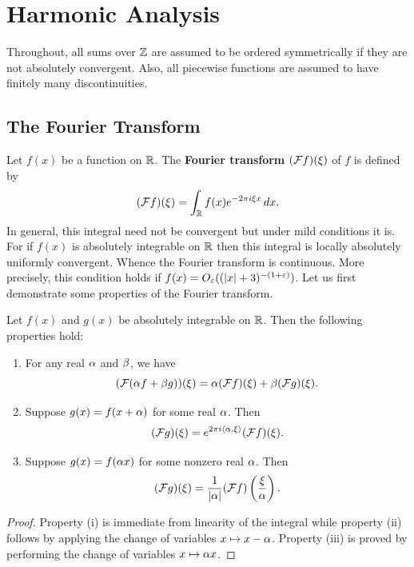 \chapter{Harmonic Analysis}
  Throughout, all sums over \(\mathbb{Z}\) are assumed to be ordered symmetrically if they are not absolutely convergent. Also, all piecewise functions are assumed to have finitely many discontinuities.
  \section{The Fourier Transform}\label{sec:the_Fourier_transform}
    Let \(f(x)\) be a function on \(\mathbb{R}\). The \textbf{Fourier transform} \((\mathcal{F}f)(\xi)\) of \(f\) is defined by
    \[
      (\mathcal{F}f)(\xi) = \int_{\mathbb{R}}f(x)e^{-2\pi i\xi x}\,dx.
    \]
    In general, this integral need not be convergent but under mild conditions it is. For if \(f(x)\) is absolutely integrable on \(\mathbb{R}\) then this integral is locally absolutely uniformly convergent. Whence the Fourier transform is continuous. More precisely, this condition holds if \(f(x) = O_{\varepsilon}((|x|+3)^{-(1+\varepsilon)})\). Let us first demonstrate some properties of the Fourier transform.

    \begin{proposition}
      Let \(f(x)\) and \(g(x)\) be absolutely integrable on \(\mathbb{R}\). Then the following properties hold:
      \begin{enumerate}[label*=(\roman*)]
        \item For any real \(\alpha\) and \(\beta\), we have
        \[
          (\mathcal{F}(\alpha f+\beta g))(\xi) = \alpha(\mathcal{F}f)(\xi)+\beta(\mathcal{F}g)(\xi).
        \]
        \item Suppose \(g(x) = f(x+\alpha)\) for some real \(\alpha\). Then
        \[
          (\mathcal{F}g)(\xi) = e^{2\pi i\langle\alpha,\xi\rangle}(\mathcal{F}f)(\xi).
        \]
        \item Suppose \(g(x) = f(\alpha x)\) for some nonzero real \(\alpha\). Then
        \[
          (\mathcal{F}g)(\xi) = \frac{1}{|\alpha|}(\mathcal{F}f)\left(\frac{\xi}{\alpha}\right).
        \]
      \end{enumerate}
    \end{proposition}
    \begin{proof}
      Property (i) is immediate from linearity of the integral while property (ii) follows by applying the change of variables \(x \mapsto x-\alpha\). Property (iii) is proved by performing the change of variables \(x \mapsto \alpha x\).
    \end{proof}

